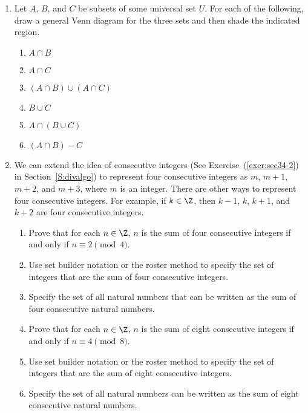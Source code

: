 \begin{enumerate}
\begin{enumerate}
\end{enumerate}
%
\item Let  $A$, $B$, and  $C$  be subsets of some universal set  $U$.  For each of the following, draw a general Venn diagram for the three sets and then shade the indicated region. \label{exer:sec41-12}
\begin{multicols}{2}
\begin{enumerate}
  \item $A \cap B$
  \item $A \cap C$
  \item $\left( {A \cap B} \right) \cup \left( {A \cap C} \right)$
  \item $B \cup C$
  \item $A \cap \left( {B \cup C} \right)$
  \item $\left( {A \cap B} \right) - C$
\end{enumerate}
\end{multicols}



\item We can extend the idea of consecutive integers (See Exercise~(\ref{exer:sec34-2}) in Section~\ref{S:divalgo}) to represent four consecutive integers as $m$, $m + 1$, $m + 2$, and $m + 3$, where $m$ is an integer.  There are other ways to represent four consecutive integers.  For example, if $k \in \Z$, then $k - 1$, $k$, $k + 1$, and $k + 2$ are four consecutive integers.
\label{exer:congruence41}%
\begin{enumerate}
\item Prove that for each $n \in \Z$, $n$ is the sum of four consecutive integers if and only if $n \equiv 2 \pmod 4$.

\item Use set builder notation or the roster method to specify the set of integers that are the sum of four consecutive integers.

\item Specify the set of all natural numbers that can be written as the sum of four consecutive natural numbers.

\item Prove that for each $n \in \Z$, $n$ is the sum of eight consecutive integers if and only if $n \equiv 4 \pmod 8$.

\item Use set builder notation or the roster method to specify the set of integers that are the sum of eight consecutive integers.

\item Specify the set of all natural numbers can be written as the sum of eight consecutive natural numbers.


\end{enumerate}
\end{enumerate}
